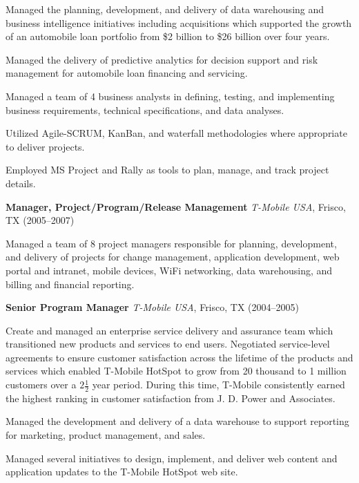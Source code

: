 \documentclass{article}
\newcommand{\sbt}{\,\begin{picture}(-1,1)(-1,-3)\circle*{3}\end{picture}\ }
\begin{document}
\begin{compactitem}

\item[\sbt] Managed the planning, development, and delivery of data warehousing and business intelligence initiatives including acquisitions which supported the growth of an automobile loan portfolio from \$2 billion to \$26 billion over four years.
\item[\sbt] Managed the delivery of predictive analytics for decision support and risk management for automobile loan financing and servicing.
\item[\sbt] Managed a team of 4 business analysts in defining, testing, and implementing business requirements, technical specifications, and data analyses.
\item[\sbt] Utilized Agile-SCRUM, KanBan, and waterfall methodologies where appropriate to deliver projects.
\item[\sbt] Employed MS Project and Rally as tools to plan, manage, and track project details.

\end{compactitem}

\smallskip

\noindent
{\bfseries Manager, Project/Program/Release Management} {\itshape T-Mobile USA}, Frisco, TX (2005--2007)

\begin{compactitem}

\item[\sbt] Managed a team of 8 project managers responsible for planning, development, and delivery of projects for change management, application development, web portal and intranet, mobile devices, WiFi networking, data warehousing, and billing and financial reporting.

\end{compactitem}

\smallskip

\noindent
{\bfseries Senior Program Manager} {\itshape T-Mobile USA}, Frisco, TX (2004--2005)

\begin{compactitem}

\item[\sbt] Create and managed an enterprise service delivery and assurance team which transitioned new products and services to end users. Negotiated service-level agreements to ensure customer satisfaction across the lifetime of the products and services which enabled T-Mobile HotSpot to grow from 20 thousand to 1 million customers over a $2 \frac{1}{2}$ year period. During this time, T-Mobile consistently earned the highest ranking in customer satisfaction from J. D. Power and Associates.
\item[\sbt] Managed the development and delivery of a data warehouse to support reporting for marketing, product management, and sales.
\item[\sbt] Managed several initiatives to design, implement, and deliver web content and application updates to the T-Mobile HotSpot web site.

\end{compactitem}
\end{document}
